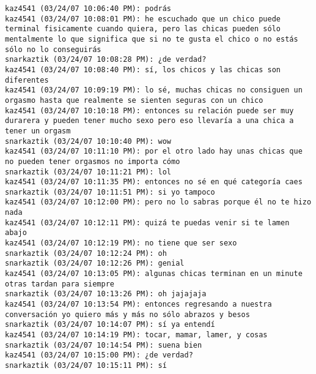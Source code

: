 \begin{verbatim}
kaz4541 (03/24/07 10:06:40 PM): podrás
kaz4541 (03/24/07 10:08:01 PM): he escuchado que un chico puede terminal fisicamente cuando quiera, pero las chicas pueden sólo mentalmente lo que significa que si no te gusta el chico o no estás sólo no lo conseguirás
snarkaztik (03/24/07 10:08:28 PM): ¿de verdad?
kaz4541 (03/24/07 10:08:40 PM): sí, los chicos y las chicas son diferentes
kaz4541 (03/24/07 10:09:19 PM): lo sé, muchas chicas no consiguen un orgasmo hasta que realmente se sienten seguras con un chico
kaz4541 (03/24/07 10:10:18 PM): entonces su relación puede ser muy durarera y pueden tener mucho sexo pero eso llevaría a una chica a tener un orgasm
snarkaztik (03/24/07 10:10:40 PM): wow
kaz4541 (03/24/07 10:11:10 PM): por el otro lado hay unas chicas que no pueden tener orgasmos no importa cómo
snarkaztik (03/24/07 10:11:21 PM): lol
kaz4541 (03/24/07 10:11:35 PM): entonces no sé en qué categoría caes
snarkaztik (03/24/07 10:11:51 PM): si yo tampoco
kaz4541 (03/24/07 10:12:00 PM): pero no lo sabras porque él no te hizo nada
kaz4541 (03/24/07 10:12:11 PM): quizá te puedas venir si te lamen abajo
kaz4541 (03/24/07 10:12:19 PM): no tiene que ser sexo
snarkaztik (03/24/07 10:12:24 PM): oh
snarkaztik (03/24/07 10:12:26 PM): genial
kaz4541 (03/24/07 10:13:05 PM): algunas chicas terminan en un minute otras tardan para siempre
snarkaztik (03/24/07 10:13:26 PM): oh jajajaja
kaz4541 (03/24/07 10:13:54 PM): entonces regresando a nuestra conversación yo quiero más y más no sólo abrazos y besos
snarkaztik (03/24/07 10:14:07 PM): sí ya entendí
kaz4541 (03/24/07 10:14:19 PM): tocar, mamar, lamer, y cosas
snarkaztik (03/24/07 10:14:54 PM): suena bien
kaz4541 (03/24/07 10:15:00 PM): ¿de verdad?
snarkaztik (03/24/07 10:15:11 PM): sí
\end{verbatim}